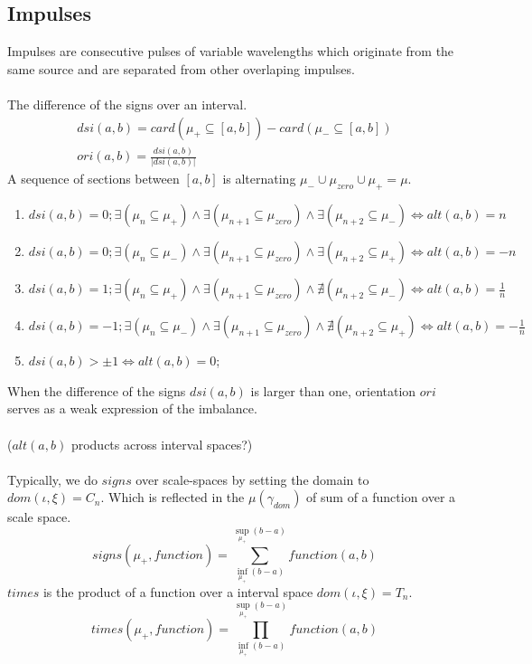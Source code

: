 \documentclass{report}
\begin{document}
\subsection{Impulses}
Impulses are consecutive pulses of variable wavelengths which originate from the same source and are separated from other overlaping impulses.\\\\
The difference of the signs over an interval.
\begin{align}
dsi(a,b) = card(\mu_{+}\subseteq [a,b])-card(\mu_{-} \subseteq [a,b])\\
ori(a,b) = \frac{dsi(a,b)}{\lvert dsi(a,b) \rvert}
\end{align}
A sequence of sections between $[a,b]$ is alternating $\mu_{-}\cup \mu_{zero}\cup\mu_{+}=\mu$.
\begin{enumerate}
\item $dsi(a,b)= 0; \exists(\mu_{n}\subseteq \mu_{+}) \land \exists(\mu_{n+1}\subseteq \mu_{zero}) \land \exists(\mu_{n+2}\subseteq \mu_{-}) \Leftrightarrow alt(a,b)=n$
\item $dsi(a,b)= 0; \exists(\mu_{n}\subseteq \mu_{-}) \land \exists(\mu_{n+1}\subseteq \mu_{zero}) \land \exists(\mu_{n+2}\subseteq \mu_{+}) \Leftrightarrow alt(a,b)=-n$
\item $dsi(a,b)= 1; \exists(\mu_{n}\subseteq \mu_{+}) \land \exists(\mu_{n+1}\subseteq \mu_{zero}) \land \nexists(\mu_{n+2}\subseteq \mu_{-}) \Leftrightarrow alt(a,b)=\frac{1}{n}$
\item $dsi(a,b)= -1; \exists(\mu_{n}\subseteq \mu_{-}) \land \exists(\mu_{n+1}\subseteq \mu_{zero}) \land \nexists(\mu_{n+2}\subseteq \mu_{+}) \Leftrightarrow alt(a,b)=-\frac{1}{n}$
\item $dsi(a,b)> \pm 1\Leftrightarrow alt(a,b)=0$;
\end{enumerate}
When the difference of the signs $dsi(a,b)$ is larger than one, orientation $ori$ serves as a weak expression of the imbalance.\\\\
($alt(a,b)$ products across interval spaces?)\\\\
Typically, we do $signs$ over scale-spaces by setting the domain to $dom(\iota,\xi)=C_{n}$.
Which is reflected in the $\mu(\gamma_{dom})$ of sum of a function over a scale space.\\
\begin{equation}
signs(\mu_{+},function )= \sum \limits _{\inf \limits _{\mu_{+}} (b-a)}^{\sup \limits _{\mu_{+}} (b-a)} function (a,b)
\end{equation}
$times$ is the product of a function over a interval space $dom(\iota,\xi)=T_{n}$.
\begin{equation}
times(\mu_{+},function) = \prod_{\inf \limits _{\mu_{+}} (b-a)}^{\sup \limits _{\mu_{+}} (b-a)} function(a,b)
\end{equation}
\end{document}
